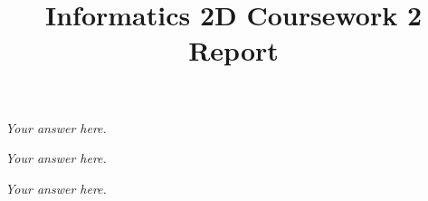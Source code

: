 \documentclass[answers]{exam}
\title{Informatics 2D Coursework 2 Report}
\author{} %
\date{} %
\begin{document}
\maketitle
\begin{questions}
\begin{framed}
\emph{Your answer here.}
\end{framed}
\begin{framed}
\emph{Your answer here.}
\end{framed}
\begin{framed}
\emph{Your answer here.}
\end{framed}
\end{questions}
\end{document}
